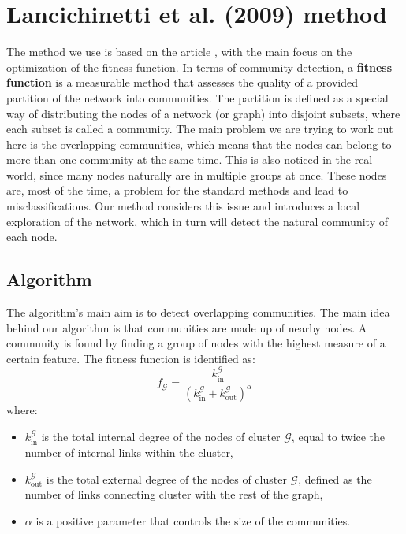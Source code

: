 \documentclass[conference]{IEEEtran}
\begin{document}
\section{Lancichinetti et al. (2009) method}
The method we use is based on the article \cite{lancichinetti2009detecting}, with the main focus on the optimization of the fitness function. In terms of community detection, a \textbf{fitness function} is a measurable method that assesses the quality of a provided partition of the network into communities. The partition is defined as a special way of distributing the nodes of a network (or graph) into disjoint subsets, where each subset is called a community. The main problem we are trying to work out here is the overlapping communities, which means that the nodes can belong to more than one community at the same time. This is also noticed in the real world, since many nodes naturally are in multiple groups at once. These nodes are, most of the time, a problem for the standard methods and lead to misclassifications. Our method considers this issue and introduces a local exploration of the network, which in turn will detect the natural community of each node. 

\subsection*{Algorithm}
The algorithm's main aim is to detect overlapping communities.  The main idea behind our algorithm is that communities are made up of nearby nodes. A community is found by finding a group of nodes with the highest measure of a certain feature. The fitness function is identified as:
\begin{equation}
    f_{\mathcal{G}} = \frac{k_{\text{in}}^{\mathcal{G}}}{\left(k_{\text{in}}^{\mathcal{G}} +k_{\text{out}}^{\mathcal{G}}\right)^\alpha}
\end{equation}
where:
\begin{itemize}
    \item \( k_{\text{in}}^{\mathcal{G}} \) is the total internal degree of the nodes of cluster \( \mathcal{G} \), equal to twice the number of internal links within the cluster, 
    \item \( k_{\text{out}}^{\mathcal{G}} \) is the total external degree of the nodes of cluster \( \mathcal{G} \), defined as the number of links connecting cluster with the rest of the graph, 
    \item \( \alpha \) is a positive parameter that controls the size of the communities.
\end{itemize}
\end{document}
